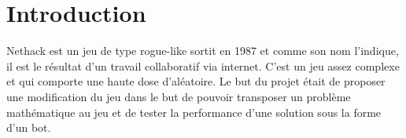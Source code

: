 \chapter*{Introduction}

Nethack est un jeu de type rogue-like sortit en 1987 et comme son nom l'indique, il est le résultat d'un travail collaboratif via internet. C'est un jeu assez complexe et qui comporte une haute dose d'aléatoire. Le but du projet était de proposer une modification du jeu dans le but de pouvoir transposer un problème mathématique au jeu et de tester la performance d'une solution sous la forme d'un bot.




